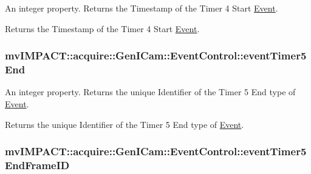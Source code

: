 An integer property. Returns the Timestamp of the Timer 4 Start \hyperlink{classmv_i_m_p_a_c_t_1_1acquire_1_1_event}{Event}. 

Returns the Timestamp of the Timer 4 Start \hyperlink{classmv_i_m_p_a_c_t_1_1acquire_1_1_event}{Event}. \hypertarget{classmv_i_m_p_a_c_t_1_1acquire_1_1_gen_i_cam_1_1_event_control_a627d5f913d207f6aa64a3f55188d6a7d}{
\subsubsection[{event\+Timer5\+End}]{ mv\+I\+M\+P\+A\+C\+T\+::acquire\+::\+Gen\+I\+Cam\+::\+Event\+Control\+::event\+Timer5\+End}}\label{classmv_i_m_p_a_c_t_1_1acquire_1_1_gen_i_cam_1_1_event_control_a627d5f913d207f6aa64a3f55188d6a7d}


An integer property. Returns the unique Identifier of the Timer 5 End type of \hyperlink{classmv_i_m_p_a_c_t_1_1acquire_1_1_event}{Event}. 

Returns the unique Identifier of the Timer 5 End type of \hyperlink{classmv_i_m_p_a_c_t_1_1acquire_1_1_event}{Event}. \hypertarget{classmv_i_m_p_a_c_t_1_1acquire_1_1_gen_i_cam_1_1_event_control_a816e64bd616314a4c54330fda85d70fa}{
\subsubsection[{event\+Timer5\+End\+Frame\+I\+D}]{ mv\+I\+M\+P\+A\+C\+T\+::acquire\+::\+Gen\+I\+Cam\+::\+Event\+Control\+::event\+Timer5\+End\+Frame\+I\+D}}\label{classmv_i_m_p_a_c_t_1_1acquire_1_1_gen_i_cam_1_1_event_control_a816e64bd616314a4c54330fda85d70fa}


